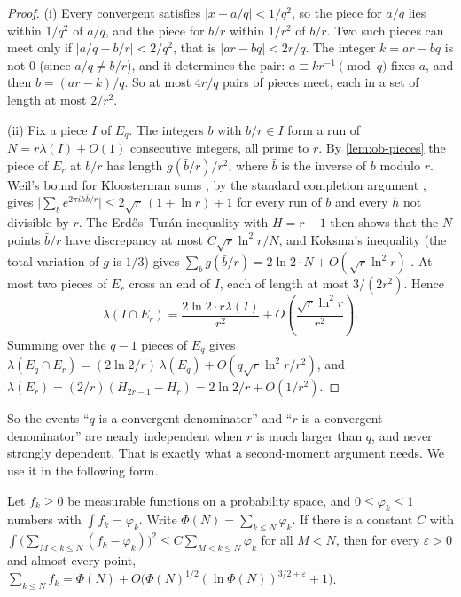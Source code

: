 \begin{proof}
(i) Every convergent satisfies $|x - a/q| < 1/q^2$, so the piece for $a/q$ lies within $1/q^2$ of $a/q$, and the piece for $b/r$ within $1/r^2$ of $b/r$. Two such pieces can meet only if $|a/q - b/r| < 2/q^2$, that is $|ar - bq| < 2r/q$. The integer $k = ar - bq$ is not 0 (since $a/q \ne b/r$), and it determines the pair: $a \equiv k r^{-1} \pmod q$ fixes $a$, and then $b = (ar - k)/q$. So at most $4r/q$ pairs of pieces meet, each in a set of length at most $2/r^2$.

(ii) Fix a piece $I$ of $E_q$. The integers $b$ with $b/r \in I$ form a run of $N = r\lambda(I) + O(1)$ consecutive integers, all prime to $r$. By \cref{lem:ob-pieces} the piece of $E_r$ at $b/r$ has length $g(\bar b/r)/r^2$, where $\bar b$ is the inverse of $b$ modulo $r$. Weil's bound for Kloosterman sums \citep{Weil1948}, by the standard completion argument \citep[Ch.~11]{IwaniecKowalski2004}, gives $\bigl|\sum_b e^{2\pi i h\bar b/r}\bigr| \le 2\sqrt r\,(1 + \ln r) + 1$ for every run of $b$ and every $h$ not divisible by $r$. The Erdős--Turán inequality with $H = r - 1$ then shows that the $N$ points $\bar b/r$ have discrepancy at most $C\sqrt r\ln^2 r/N$, and Koksma's inequality (the total variation of $g$ is $1/3$) gives $\sum_b g(\bar b/r) = 2\ln 2 \cdot N + O(\sqrt r\ln^2 r)$ \citep[Ch.~1--2]{KuipersNiederreiter1974}. At most two pieces of $E_r$ cross an end of $I$, each of length at most $3/(2r^2)$. Hence
\[
  \lambda(I \cap E_r) = \frac{2\ln 2\cdot r\lambda(I)}{r^2} + O\!\left(\frac{\sqrt r\ln^2 r}{r^2}\right).
\]
Summing over the $q - 1$ pieces of $E_q$ gives $\lambda(E_q\cap E_r) = (2\ln 2/r)\,\lambda(E_q) + O(q\sqrt r\ln^2 r/r^2)$, and $\lambda(E_r) = (2/r)(H_{2r-1} - H_r) = 2\ln 2/r + O(1/r^2)$.
\end{proof}

So the events ``$q$ is a convergent denominator'' and ``$r$ is a convergent denominator'' are nearly independent when $r$ is much larger than $q$, and never strongly dependent. That is exactly what a second-moment argument needs. We use it in the following form.

\begin{lemma}\label{lem:ob-harman}
Let $f_k \ge 0$ be measurable functions on a probability space, and $0 \le \varphi_k \le 1$ numbers with $\int f_k = \varphi_k$. Write $\Phi(N) = \sum_{k \le N}\varphi_k$. If there is a constant $C$ with
$\int \bigl(\sum_{M < k \le N}(f_k - \varphi_k)\bigr)^2 \le C\sum_{M < k \le N}\varphi_k$ for all $M < N$, then for every $\varepsilon > 0$ and almost every point,
$\sum_{k \le N} f_k = \Phi(N) + O\bigl(\Phi(N)^{1/2}(\ln \Phi(N))^{3/2+\varepsilon} + 1\bigr)$.
\end{lemma}


